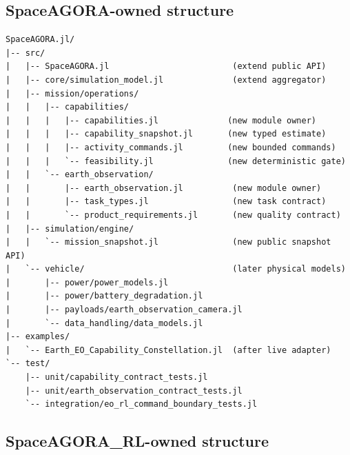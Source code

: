 \documentclass[11pt]{article}
\begin{document}
\subsection{SpaceAGORA-owned structure}

\begin{verbatim}
SpaceAGORA.jl/
|-- src/
|   |-- SpaceAGORA.jl                         (extend public API)
|   |-- core/simulation_model.jl              (extend aggregator)
|   |-- mission/operations/
|   |   |-- capabilities/
|   |   |   |-- capabilities.jl              (new module owner)
|   |   |   |-- capability_snapshot.jl       (new typed estimate)
|   |   |   |-- activity_commands.jl         (new bounded commands)
|   |   |   `-- feasibility.jl               (new deterministic gate)
|   |   `-- earth_observation/
|   |       |-- earth_observation.jl          (new module owner)
|   |       |-- task_types.jl                 (new task contract)
|   |       `-- product_requirements.jl       (new quality contract)
|   |-- simulation/engine/
|   |   `-- mission_snapshot.jl               (new public snapshot API)
|   `-- vehicle/                              (later physical models)
|       |-- power/power_models.jl
|       |-- power/battery_degradation.jl
|       |-- payloads/earth_observation_camera.jl
|       `-- data_handling/data_models.jl
|-- examples/
|   `-- Earth_EO_Capability_Constellation.jl  (after live adapter)
`-- test/
    |-- unit/capability_contract_tests.jl
    |-- unit/earth_observation_contract_tests.jl
    `-- integration/eo_rl_command_boundary_tests.jl
\end{verbatim}

\subsection{SpaceAGORA\_RL-owned structure}
\end{document}
